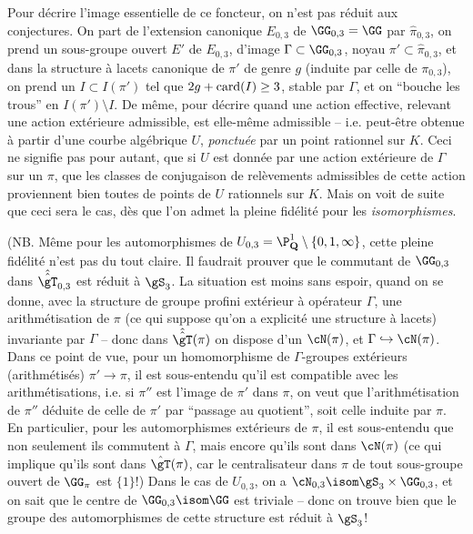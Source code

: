 Pour décrire l'image essentielle de ce foncteur, on n'est
pas réduit aux conjectures.  On part de l'extension canonique
$E_{0,3}$ de $\GG_{0,3}=\GG$ par $\hat\pi_{0,3}$,
on prend un sous-groupe ouvert $E'$ de $E_{0,3}$,
d'image $\Gamma\subset \GG_{0,3}$, noyau $\pi'\subset \hat\pi_{0,3}$,
et dans la structure à lacets canonique de $\pi'$ de
genre $g$ (induite par celle de $\pi_{0,3}$), on prend un
$I\subset  I(\pi')$ tel que $2g+{\rm card}(I)\ge 3$, stable par
$\Gamma$, et on ``bouche les trous'' en $I(\pi')\setminus I$.
De même, pour décrire quand une action effective, relevant une
action extérieure admissible, est elle-même admissible --
i.e. peut-être obtenue à partir d'une courbe algébrique
$U$, {\it ponctuée} par un point rationnel sur $K$.
Ceci ne signifie pas pour autant, que si $U$ est donnée
par une action extérieure de $\Gamma$ sur un $\pi$, que
les classes de conjugaison de relèvements admissibles
de cette action proviennent bien toutes de points de
$U$ rationnels sur $K$.  Mais on voit de suite que ceci
sera le cas, dès que l'on admet la pleine fidélité
pour les {\it isomorphismes}.

(NB. Même pour les automorphismes
de $U_{0,3}=\P^1_{{\mathbf{Q}}}\setminus\{0,1,\infty\}$, cette
pleine fidélité n'est pas du tout claire.  Il faudrait prouver
que le commutant de $\GG_{0,3}$ dans $\hat{\hat\gT}_{0,3}$ est
réduit à $\gS_3$.  La situation est moins sans espoir,
quand on se donne, avec la structure de groupe profini extérieur
à opérateur $\Gamma$, une arithmétisation de $\pi$ (ce
qui suppose qu'on a explicité une structure à lacets)
invariante par $\Gamma$ -- donc dans $\hat{\hat\gT}(\pi)$ on
dispose d'un $\cN(\pi)$, et $\Gamma\hookrightarrow \cN(\pi)$.
Dans ce point de vue, pour un homomorphisme de $\Gamma$-groupes
extérieurs (arithmétisés) $\pi'\to\pi$, il est
sous-entendu qu'il est compatible avec les arithmétisations,
i.e. si $\pi''$ est l'image de $\pi'$ dans $\pi$, on veut 
que l'arithmétisation de $\pi''$ déduite de celle de
$\pi'$ par ``passage au quotient'', soit celle induite par $\pi$.
En particulier, pour les automorphismes extérieurs de $\pi$,
il est sous-entendu que non seulement ils commutent à
$\Gamma$, mais encore qu'ils sont dans $\cN(\pi)$ (ce qui
implique qu'ils sont dans $\hat\gT(\pi)$, car le centralisateur
dans $\pi$ de tout sous-groupe ouvert de $\GG_\pi$ est
$\{1\}$!)  Dans le cas de $U_{0,3}$, on a $\cN_{0,3} \isom 
\gS_3\times\GG_{0,3}$, et on sait que le centre de $\GG_{0,3}
 \isom \GG$ est triviale -- donc on trouve bien que le groupe des
automorphismes de cette structure est réduit à $\gS_3$!

